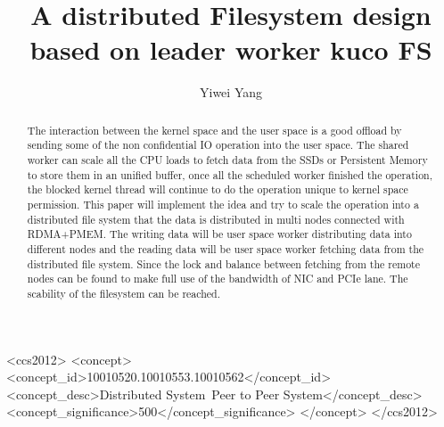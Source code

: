 \documentclass[acmtog]{acmart}
\begin{document}
\title{A distributed Filesystem design based on leader worker kuco FS}

\author{Yiwei Yang}

\renewcommand{\shortauthors}{Yiwei Yang}

\begin{abstract}
The interaction between the kernel space and the user space is a good offload by sending some of the non confidential IO operation into the user space. The shared worker can scale all the CPU loads to fetch data from the SSDs or Persistent Memory to store them in an unified buffer, once all the scheduled worker finished the operation, the blocked kernel thread will continue to do the operation unique to kernel space permission. This paper will implement the idea and try to scale the operation into a distributed file system that the data is distributed in multi nodes connected with RDMA+PMEM. The writing data will be user space worker distributing data into different nodes and the reading data will be user space worker fetching data from the distributed file system. Since the lock and balance between fetching from the remote nodes can be found to make full use of the bandwidth of NIC and PCIe lane. The scability of the filesystem can be reached.
\end{abstract}

\begin{CCSXML}
  <ccs2012>
  <concept>
  <concept_id>10010520.10010553.10010562</concept_id>
  <concept_desc>Distributed System~Peer to Peer System</concept_desc>
  <concept_significance>500</concept_significance>
  </concept>
  </ccs2012>
\end{CCSXML}
\end{document}
